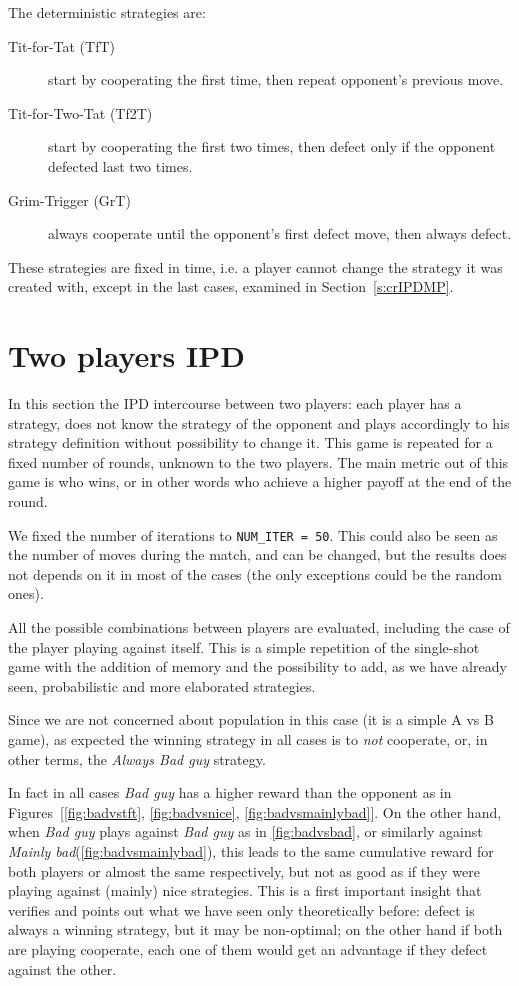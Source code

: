\documentclass[journal,a4paper,10pt,twoside]{IEEEtran} %
\begin{document}
The deterministic strategies are:
\begin{description}
    \item[Tit-for-Tat (TfT)] start by cooperating the first time, then repeat opponent's previous move.
    \item[Tit-for-Two-Tat (Tf2T)] start by cooperating the first two times, then defect only if the opponent defected last two times.
    \item[Grim-Trigger (GrT)] always cooperate until the opponent's first defect move, then always defect. 
\end{description}

These strategies are fixed in time, i.e. a player cannot change the strategy it was created with, except in the last cases, examined in Section~\ref{s:crIPDMP}.

\section{Two players IPD} \label{s:IPD2P}
In this section the IPD intercourse between two players: each player has a strategy, does not know the strategy of the opponent and plays accordingly to his strategy definition without possibility to change it. This game is repeated for a fixed number of rounds, unknown to the two players. The main metric out of this game is who wins, or in other words who achieve a higher payoff at the end of the round.

We fixed the number of iterations to \texttt{NUM\_ITER = 50}. This could also be seen as the number of moves during the match, and can be changed, but the results does not depends on it in most of the cases (the only exceptions could be the random ones).

All the possible combinations between players are evaluated, including the case of the player playing against itself.
This is a simple repetition of the single-shot game with the addition of memory and the possibility to add, as we have already seen, probabilistic and more elaborated strategies.

Since we are not concerned about population in this case (it is a simple A vs B game), as expected the winning strategy in all cases is to \textit{not} cooperate, or, in other terms, the \textit{Always Bad guy} strategy. 

In fact in all cases \textit{Bad guy} has a higher reward than the opponent as in Figures~[\ref{fig:badvstft}, \ref{fig:badvsnice}, \ref{fig:badvsmainlybad}]. 
On the other hand, when \textit{Bad guy} plays against \textit{Bad guy} as in \autoref{fig:badvsbad}, or similarly against \textit{Mainly bad}(\autoref{fig:badvsmainlybad}), this leads to the same cumulative reward for both players or almost the same respectively, but not as good as if they were playing against (mainly) nice strategies. This is a first important insight that verifies and points out what we have seen only theoretically before: defect is always a winning strategy, but it may be non-optimal; on the other hand if both are playing cooperate, each one of them would get an advantage if they defect against the other.
\end{document}
